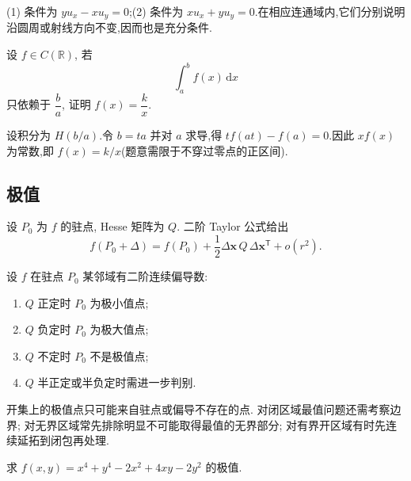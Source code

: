 \begin{solution}

    (1) 条件为 $yu_x-xu_y=0$;(2) 条件为 $xu_x+yu_y=0$.在相应连通域内,它们分别说明沿圆周或射线方向不变,因而也是充分条件.
\end{solution}

\begin{example}
    设 $f\in C(\mathbb{R})$, 若
    \[
        \displaystyle\int_a^bf(x)\,\mathrm{d}x
    \]
    只依赖于 $\dfrac{b}{a}$, 证明 $f(x)=\dfrac{k}{x}$.
\end{example}
\exampleblank

\begin{solution}
    设积分为 $H(b/a)$.令 $b=ta$ 并对 $a$ 求导,得 $t f(at)-f(a)=0$.因此 $xf(x)$ 为常数,即 $f(x)=k/x$(题意需限于不穿过零点的正区间).
\end{solution}



\subsection{极值}



设 $P_0$ 为 $f$ 的驻点, Hesse 矩阵为 $Q$. 二阶 Taylor 公式给出
\[
    f(P_0+\Delta)=f(P_0)+\dfrac{1}{2}\Delta\bm x\,Q\,\Delta\bm x^{\mathsf T}+o(r^2).
\]

\begin{theorem}[\markstar]
    设 $f$ 在驻点 $P_0$ 某邻域有二阶连续偏导数:
    \begin{enumerate}
        \item $Q$ 正定时 $P_0$ 为极小值点;
        \item $Q$ 负定时 $P_0$ 为极大值点;
        \item $Q$ 不定时 $P_0$ 不是极值点;
        \item $Q$ 半正定或半负定时需进一步判别.
    \end{enumerate}
\end{theorem}

\begin{remark}
    开集上的极值点只可能来自驻点或偏导不存在的点. 对闭区域最值问题还需考察边界; 对无界区域常先排除明显不可能取得最值的无界部分; 对有界开区域有时先连续延拓到闭包再处理.
\end{remark}

\begin{example}
    求 $f(x,y)=x^4+y^4-2x^2+4xy-2y^2$ 的极值.
\end{example}
\exampleblank

